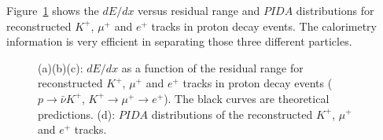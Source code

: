Figure~\ref{dedx} shows the $dE/dx$ versus residual range and $PIDA$ distributions for reconstructed $K^{+}$, $\mu^{+}$ and $e^{+}$ tracks in proton decay events. The calorimetry information is very efficient in separating those three different particles.

\begin{figure}[!ht]
\caption{(a)(b)(c): $dE/dx$ as a function of the residual range for reconstructed $K^{+}$, $\mu^{+}$ and $e^{+}$ tracks in proton decay events ($p\rightarrow\bar{\nu}K^{+}$, $K^{+}\rightarrow\mu^{+}\rightarrow e^{+}$). The black curves are theoretical predictions. (d): $PIDA$ distributions of the reconstructed $K^{+}$, $\mu^{+}$ and $e^{+}$ tracks.}
\label{dedx}
\end{figure}


